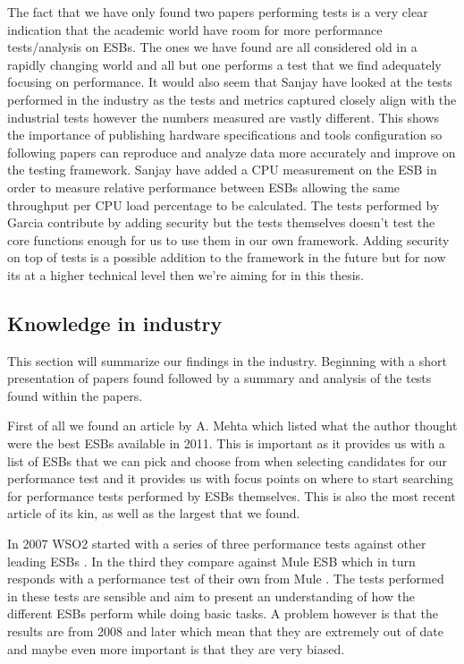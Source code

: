 The fact that we have only found two papers \cite{Sanjay2011,Garcia2010} performing tests is a very clear indication that the academic world have room for more performance tests/analysis on ESBs. The ones we have found are all considered old in a rapidly changing world and all but one \cite{Sanjay2011} performs a test that we find adequately focusing on performance. 
It would also seem that Sanjay \cite{Sanjay2011} have looked at the tests performed in the industry \cite{Perera07,Perera07R2,Perera07R3,mulesoft08} as the tests and metrics captured closely align with the industrial tests however the numbers measured are vastly different. 
This shows the importance of publishing hardware specifications and tools configuration so following papers can reproduce and analyze data more accurately and improve on the testing framework.
Sanjay have added a CPU measurement on the ESB in order to measure relative performance between ESBs allowing the same throughput per CPU load percentage to be calculated.
The tests performed by Garcia \cite{Garcia2010} contribute by adding security but the tests themselves doesn't test the core functions enough for us to use them in our own framework. 
Adding security on top of tests is a possible addition to the framework in the future but for now its at a higher technical level then we're aiming for in this thesis.


\subsection{Knowledge in industry}
\label{sec:industry_section}
This section will summarize our findings in the industry. Beginning with a short presentation of papers found followed by a summary and analysis of the tests found within the papers.


First of all we found an article by A. Mehta \cite{mehta11} which listed what the author thought were the best ESBs available in 2011. This is important as it provides us with a list of ESBs that we can pick and choose from when selecting candidates for our performance test and it provides us with focus points on where to start searching for performance tests performed by ESBs themselves. This is also the most recent article of its kin, as well as the largest that we found.


In 2007 WSO2 started with a series of three performance tests against other leading ESBs \cite{Perera07,Perera07R2,Perera07R3}. In the third they compare against Mule ESB which in turn responds with a performance test of their own from Mule \cite{mulesoft08}. The tests performed in these tests are sensible and aim to present an understanding of how the different ESBs perform while doing basic tasks. A problem however is that the results are from 2008 and later which mean that they are extremely out of date and maybe even more important is that they are very biased.


